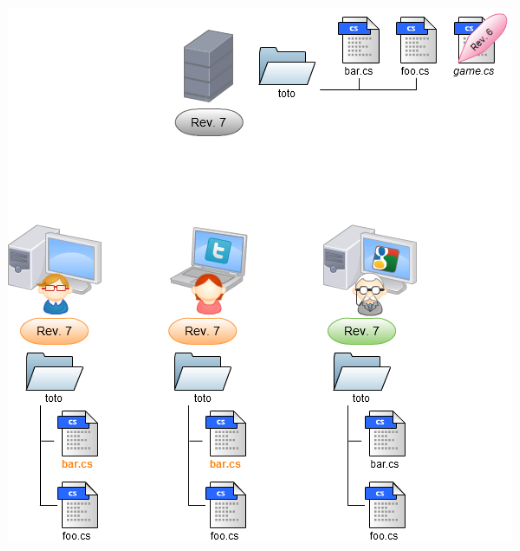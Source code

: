 \begin{frame}
  \begin{center}
    \includegraphics[scale=0.3]{images/12-Work.png}
  \end{center}
\end{frame}

